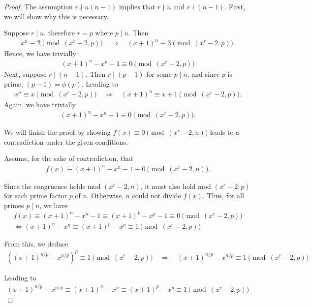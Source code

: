 \documentclass{article}
\theoremstyle{plain}
\theoremstyle{definition}
\begin{document}
\begin{proof}
The assumption $r \nmid n (n-1)$ implies that $r \nmid n$ and $r \nmid (n-1)$. First, we will show why this is necessary.

Suppose $r \mid n$, therefore $r = p$ where $p \mid n$. Then
\begin{align*}
    x^n \equiv 2 \pmod{(x^r-2, p)}
    \quad \Longrightarrow \quad
    (x+1)^n \equiv 3 \pmod{(x^r-2, p)} .
\end{align*}
Hence, we have trivially
\begin{align*}
    (x+1)^n - x^n - 1 \equiv 0 \pmod{(x^r-2, p)}
\end{align*}
Next, suppose $r \mid (n-1)$. Then $r \mid (p-1)$ for some $p \mid n$, and since $p$ is prime, $(p-1) = \phi(p)$. Leading to
\begin{align*}
    x^n \equiv x \pmod{(x^r-2, p)}
    \quad \Longrightarrow \quad
    (x+1)^n \equiv x+1 \pmod{(x^r-2, p)} .
\end{align*}
Again, we have trivially
\begin{align*}
    (x+1)^n - x^n - 1 \equiv 0 \pmod{(x^r-2, p)} .
\end{align*}

We will finish the proof by showing $f(x) \equiv 0 \pmod{(x^r-2, n)}$ leads to a contradiction under the given conditions.

Assume, for the sake of contradiction, that
\begin{align*}
    f(x) \equiv (x+1)^n - x^n - 1 \equiv 0 \pmod{(x^r-2, n)} .
\end{align*}

Since the congruence holds mod $(x^r-2, n)$, it must also hold mod $(x^r-2, p)$ for each prime factor $p$ of $n$. Otherwise, $n$ could not divide $f(x)$. Thus, for all primes $p \mid n$, we have
\begin{align*}
f(x) \equiv (x+1)^n - x^n - 1 \equiv (x+1)^p - x^p - 1 \equiv 0 \pmod{(x^r-2, p)} \\
\Longleftrightarrow (x+1)^n - x^n \equiv (x+1)^p - x^p \equiv 1 \pmod{(x^r-2, p)}
\end{align*}

From this, we deduce
\begin{align*}
\left( (x+1)^{n/p} - x^{n/p} \right)^p \equiv 1 \pmod{(x^r-2, p)}
\quad\Longrightarrow\quad
(x+1)^{n/p} - x^{n/p} \equiv 1 \pmod{(x^r-2, p)}
\end{align*}

Leading to
\begin{align*}
(x+1)^{n/p} - x^{n/p} \equiv (x+1)^n - x^n \equiv (x+1)^p - x^p \equiv 1 \pmod{(x^r-2, p)}
\end{align*}


\end{proof}
\end{document}

